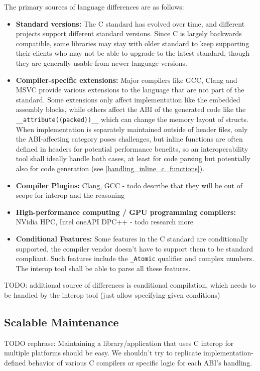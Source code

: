 The primary sources of language differences are as follows:
\begin{itemize}
    \item \textbf{Standard versions:} The C standard has evolved over time, and different projects support different standard versions. Since C is largely backwards compatible, some libraries may stay with older standard to keep supporting their clients who may not be able to upgrade to the latest standard, though they are generally usable from newer language versions.
    \item \textbf{Compiler-specific extensions:} Major compilers like GCC, Clang and MSVC provide various extensions to the language that are not part of the standard. Some extensions only affect implementation like the embedded assembly blocks, while others affect the ABI of the generated code like the \verb|__attribute((packed))__| which can change the memory layout of structs. When implementation is separately maintained outside of header files, only the ABI-affecting category poses challenges, but inline functions are often defined in headers for potential performance benefits, so an interoperability tool shall ideally handle both cases, at least for code parsing but potentially also for code generation (see \autoref{handling_inline_c_functions}).
    \item \textbf{Compiler Plugins:} Clang, GCC - todo describe that they will be out of scope for interop and the reasoning
    \item \textbf{High-performance computing / GPU programming compilers:} NVidia HPC, Intel oneAPI DPC++ - todo research more
    \item \textbf{Conditional Features:} Some features in the C standard are conditionally supported, the compiler vendor doesn't have to support them to be standard compliant. Such features include the \verb|_Atomic| qualifier and complex numbers. The interop tool shall be able to parse all these features.
\end{itemize}
 
TODO: additional source of differences is conditional compilation, which needs to be handled by the interop tool (just allow specifying given conditions)

\subsection{Scalable Maintenance}
TODO rephrase: Maintaining a library/application that uses C interop for multiple platforms should be easy. We shouldn't try to replicate implementation-defined behavior of various C compilers or specific logic for each ABI's handling.

